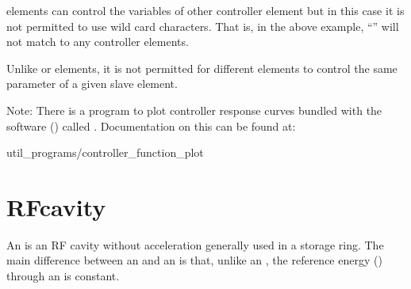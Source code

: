{ elements can control the variables of other controller element but in this case it is
not permitted to use wild card characters. That is, in the above example, ``\vn{*}'' will not match
to any controller elements.

Unlike  or  elements, it is not permitted for different  elements
to control the same parameter of a given slave element.

Note: There is a program to plot controller response curves bundled with the \bmad software
() called . Documentation on this can
be found at:
\begin{example}
  util_programs/controller_function_plot
\end{example}

\section{RFcavity}
\label{s:rfcav}

An  is an RF cavity without acceleration generally used
in a storage ring. The main difference between an  and an
 is that, unlike an , the reference energy
() through an  is constant.

}
